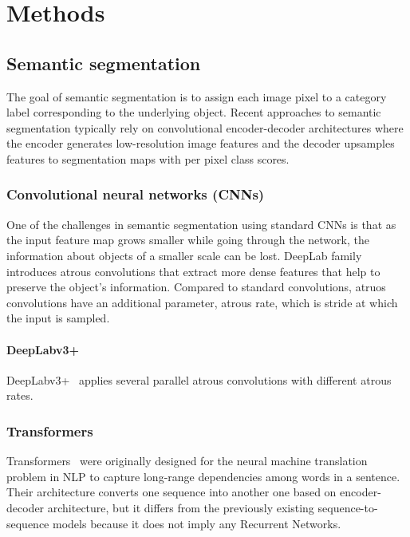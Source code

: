 \chapter{Methods}
\section{Semantic segmentation}
The goal of semantic segmentation is to assign each image pixel to a category label corresponding to the underlying object. Recent approaches to semantic segmentation typically rely on convolutional encoder-decoder architectures where the encoder generates low-resolution image features and the decoder upsamples features to segmentation maps with per pixel class scores. 
\subsection{Convolutional neural networks (CNNs)}
One of the challenges in semantic segmentation using standard CNNs is that as the input feature map grows smaller while going through the network, 
the information about objects of a smaller scale can be lost. DeepLab family introduces atrous convolutions that extract more dense features
that help to preserve the object's information. Compared to standard convolutions, atruos convolutions have an additional parameter, atrous
rate, which is stride at which the input is sampled.
\subsubsection{DeepLabv3+}
DeepLabv3+~\cite{chen2018encoder} applies several parallel atrous convolutions with different atrous rates.

\subsection{Transformers}
Transformers~\cite{vaswani2017attention} were originally designed for the neural machine translation problem in NLP to capture long-range dependencies among words in a sentence. Their architecture converts one sequence into another one based on encoder-decoder architecture, but it differs from the previously existing sequence-to-sequence models because it does not imply any Recurrent Networks. 

